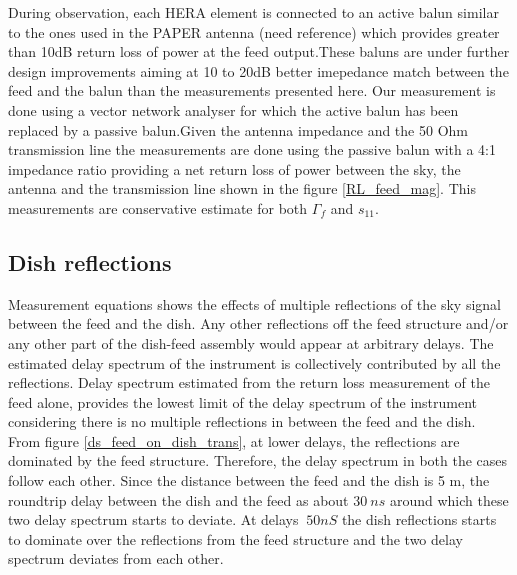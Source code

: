 \documentclass[twocolumn]{emulateapj}
\begin{document}
During observation, each HERA element is connected to an active balun similar to the ones used in the PAPER antenna (need reference) which provides greater than 10dB return loss of power at the feed output.These baluns are under further design improvements aiming at 10 to 20dB better imepedance match between the feed and the balun than the measurements presented here.  Our measurement is done using a vector network analyser for which the active balun has been replaced by a passive balun.Given the antenna impedance and the 50 Ohm transmission line the measurements are done using the passive balun with a 4:1 impedance ratio providing a net return loss of power between the sky, the antenna and the transmission line shown in the figure \ref{RL_feed_mag}. This measurements are conservative estimate  for both $\Gamma_{f}$ and $s_{11}$.

\subsection{\textbf{Dish reflections}}
Measurement equations shows the effects of multiple reflections of the sky signal between the feed and the dish. Any other reflections off the feed structure and/or any other part of the dish-feed assembly would appear at arbitrary delays. The estimated delay spectrum of the instrument is collectively contributed by all the reflections. Delay spectrum estimated from the return loss measurement of the feed alone,  provides the lowest limit of the delay spectrum of the instrument considering there is no multiple reflections in between the feed and the dish. 
From figure \ref{ds_feed_on_dish_trans}, at lower delays, the reflections are dominated by the feed structure. Therefore, the delay spectrum in both the cases follow each other. Since the distance between the feed and the dish is 5 m, the roundtrip delay between the dish and the feed as about $30~ns$ around which these two delay spectrum starts to deviate. At delays $\> 50nS$ the dish reflections starts to dominate over the reflections from the feed structure and the two delay spectrum deviates from each other. 
\end{document}
